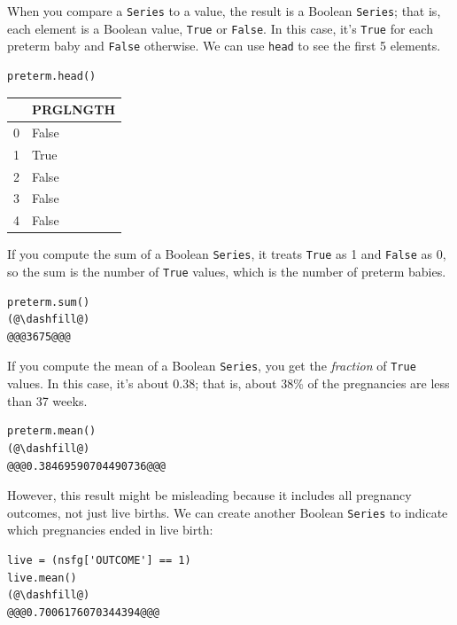When you compare a \passthrough{\lstinline!Series!} to a value, the
result is a Boolean \passthrough{\lstinline!Series!}; that is, each
element is a Boolean value, \passthrough{\lstinline!True!} or
\passthrough{\lstinline!False!}. In this case, it's
\passthrough{\lstinline!True!} for each preterm baby and
\passthrough{\lstinline!False!} otherwise. We can use
\passthrough{\lstinline!head!} to see the first 5 elements.

\begin{lstlisting}[]
preterm.head()
\end{lstlisting}

\begin{tabular}{ll}
\midrule
{} &  PRGLNGTH \\
\midrule
0 &     False \\
1 &      True \\
2 &     False \\
3 &     False \\
4 &     False \\
\midrule
\end{tabular}

If you compute the sum of a Boolean \passthrough{\lstinline!Series!}, it
treats \passthrough{\lstinline!True!} as 1 and
\passthrough{\lstinline!False!} as 0, so the sum is the number of
\passthrough{\lstinline!True!} values, which is the number of preterm
babies.

\begin{lstlisting}[]
preterm.sum()
(@\dashfill@)
@@@3675@@@
\end{lstlisting}

If you compute the mean of a Boolean \passthrough{\lstinline!Series!},
you get the \emph{fraction} of \passthrough{\lstinline!True!} values. In
this case, it's about 0.38; that is, about 38\% of the pregnancies are
less than 37 weeks.

\begin{lstlisting}[]
preterm.mean()
(@\dashfill@)
@@@0.38469590704490736@@@
\end{lstlisting}

However, this result might be misleading because it includes all
pregnancy outcomes, not just live births. We can create another Boolean
\passthrough{\lstinline!Series!} to indicate which pregnancies ended in
live birth:

\begin{lstlisting}[]
live = (nsfg['OUTCOME'] == 1)
live.mean()
(@\dashfill@)
@@@0.7006176070344394@@@
\end{lstlisting}

